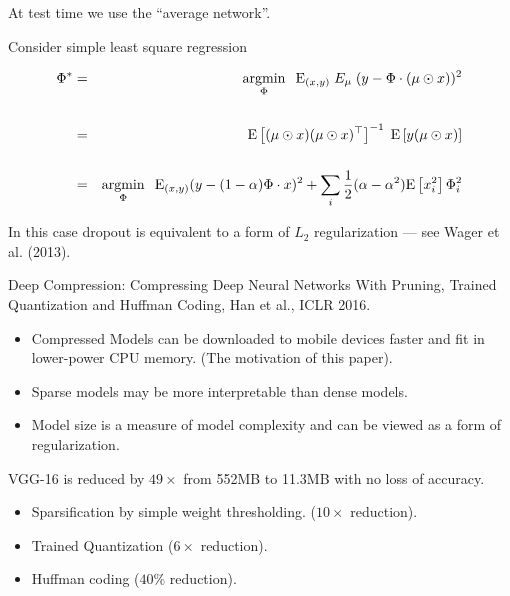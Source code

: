 {\vfill
At test time we use the ``average network''.


Consider simple least square regression

\begin{eqnarray*}
  \Phi^* & = &  \operatorname*{argmin}_\Phi\;\; \mathrm{E}_{(x,y)} \;E_{\mu}\;(y - \Phi \cdot (\mu \odot x))^2 \\
  \\
  & = & \mathrm{E}\left[(\mu\odot x)(\mu\odot x)^{\top}\right]^{-1}\; \mathrm{E}\left[y (\mu\odot x)\right] \\
  \\
  & = & \operatorname*{argmin}_\Phi\;\; \mathrm{E}_{(x,y)} (y - (1-\alpha) \Phi \cdot x)^2 + \sum_i\frac{1}{2}(\alpha - \alpha^2) \mathrm{E}\left[x_i^2\right] \Phi_i^2
\end{eqnarray*}

\vfill
In this case dropout is equivalent to a form of $L_2$ regularization --- see Wager et al. (2013).


Deep Compression: Compressing Deep Neural
Networks With Pruning, Trained Quantization
and Huffman Coding, Han et al., ICLR 2016.

\vfill
\begin{itemize}
\item Compressed Models can be downloaded to mobile devices faster and fit in lower-power CPU memory.  (The motivation of this paper).

\vfill
\item Sparse models may be more interpretable than dense models.

\vfill
\item Model size is a measure of model complexity and can be viewed as a form of regularization.
\end{itemize}

\vfill
VGG-16 is reduced by $49 \times$ from 552MB to 11.3MB with no loss of accuracy.


\begin{itemize}
\item Sparsification by simple weight thresholding.  ($10 \times$ reduction).

  \vfill
\item Trained Quantization ($6\times$ reduction).

  \vfill
\item Huffman coding ($40\%$ reduction).
\end{itemize}

}
